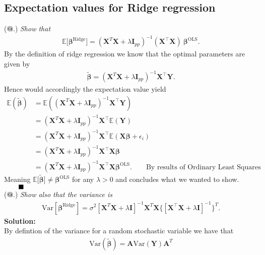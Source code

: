 \documentclass[12pt,
               a4paper,
               article,
               oneside,
               norsk,oldfontcommands]{memoir}
\makeatletter
\newcommand*{\rom}[1]{\expandafter\@slowromancap\romannumeral #1@}
\newcommand{\Q}{ \qquad \hfill \blacksquare}
\newcommand{\spaze}{\vspace{4mm}\\}
\makeatother
\begin{document}
\subsection*{ \centering Expectation values for Ridge regression}
(\textbf{\rom{1}}.) \emph{Show that}
\begin{align*}
\mathbb{E} \big[ \boldsymbol{\beta}^{\mathrm{Ridge}} \big]=(\mathbf{X}^{T} \mathbf{X} + \lambda \mathbf{I}_{pp})^{-1} (\mathbf{X}^{\top} \mathbf{X})\
\boldsymbol{\beta}^{\mathrm{OLS}}.
\end{align*}
By the definition of ridge regression we know that the optimal parameters are given by 
\begin{align*}
\tilde{\boldsymbol{\beta}} =(\mathbf{X}^{T} \mathbf{X} + \lambda \mathbf{I}_{pp})^{-1} \mathbf{X}^{\top} \mathbf{Y}.
\end{align*}
Hence would accordingly the expectation value yield 
\begin{align*}
\mathbb{E}(\tilde{\boldsymbol{\beta}}) &= \mathbb{E} \left( (\mathbf{X}^{T} \mathbf{X} + \lambda \mathbf{I}_{pp})^{-1} \mathbf{X}^{\top} \mathbf{Y} \right) \\[5pt]
&= (\mathbf{X}^{T} \mathbf{X} + \lambda \mathbf{I}_{pp})^{-1} \mathbf{X}^{\top} \mathbb{E}(\mathbf{Y}) \\[5pt] 
&= (\mathbf{X}^{T} \mathbf{X} + \lambda \mathbf{I}_{pp})^{-1} \mathbf{X}^{\top} \mathbb{E}( \mathbf{X} \boldsymbol{\beta} + \epsilon_i) \\[5pt] 
&= (\mathbf{X}^{T} \mathbf{X} + \lambda \mathbf{I}_{pp})^{-1} \mathbf{X}^{\top} \mathbf{X} \boldsymbol{\beta} \\[5pt]
&= (\mathbf{X}^{T} \mathbf{X} + \lambda \mathbf{I}_{pp})^{-1} \mathbf{X}^{\top} \mathbf{X} \boldsymbol{\beta}^{\mathrm{OLS}}. \qquad \boxed{\text{By results of Ordinary Least Squares}}
\end{align*}
Meaning $\mathbb{E} \big[ \tilde{\boldsymbol{\beta}}\big] \not= \boldsymbol{\beta}^{\mathrm{OLS}}$ for any $\lambda > 0$ and concludes what we wanted to show. $\Q$ \spaze 
(\textbf{\rom{2}}.) \emph{Show also that the variance is} 
\begin{align*}
\text{Var}[\boldsymbol{\beta}^{\mathrm{Ridge}}]=\sigma^2[  \mathbf{X}^{T} \mathbf{X} + \lambda \mathbf{I} ]^{-1}  \mathbf{X}^{T}\mathbf{X} \{ [  \mathbf{X}^{\top} \mathbf{X} + \lambda \mathbf{I} ]^{-1}\}^{T}.
\end{align*}
\textbf{Solution:} \spaze 
By defintion of the variance for a random stochastic variable we have that 
\begin{align*}
\text{Var}( \tilde{\boldsymbol{\beta}}) = \mathbf{A}\text{Var}(\mathbf{Y}) \mathbf{A}^T
\end{align*}
\end{document}
